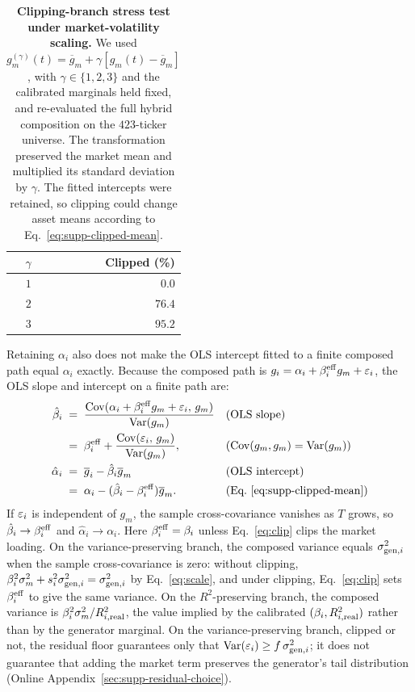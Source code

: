 \begin{table}[H]
\centering
\caption{\textbf{Clipping-branch stress test under market-volatility
    scaling.} We used
    $g_m^{(\gamma)}(t)=\overline{g}_m+
    \gamma[g_m(t)-\overline{g}_m]$, with
    $\gamma\in\{1,2,3\}$ and the calibrated marginals held fixed,
    and re-evaluated the full hybrid composition on the $423$-ticker
    universe. The transformation preserved the market mean and
    multiplied its standard deviation by $\gamma$. The fitted
    intercepts were retained, so clipping could change asset means
    according to Eq.~\eqref{eq:supp-clipped-mean}.}
\label{tab:stress}
\small
\begin{tabular}{@{}rr@{}}
\toprule
\textbf{$\gamma$} & \textbf{Clipped (\%)} \\ \midrule
$1$ & $0.0$  \\
$2$ & $76.4$ \\
$3$ & $95.2$ \\
\bottomrule
\end{tabular}
\end{table}

Retaining $\alpha_i$ also does not make the OLS intercept fitted to a
finite composed path equal $\alpha_i$ exactly. Because the composed
path is $g_i = \alpha_i + \beta_i^{\mathrm{eff}} g_m + \varepsilon_i$, the OLS slope
and intercept on a finite path are:
\begin{align}
  \hat\beta_i
    &\;=\; \frac{\operatorname{Cov}(\alpha_i + \beta_i^{\mathrm{eff}} g_m + \varepsilon_i,\, g_m)}{\operatorname{Var}(g_m)}
    && \text{(OLS slope)} \notag \\
    &\;=\; \beta_i^{\mathrm{eff}} + \frac{\operatorname{Cov}(\varepsilon_i,\, g_m)}{\operatorname{Var}(g_m)},
    && \text{($\operatorname{Cov}(g_m, g_m) = \operatorname{Var}(g_m)$)} \notag \\
  \hat\alpha_i
    &\;=\; \overline{g}_i-\hat\beta_i\overline{g}_m
    && \text{(OLS intercept)} \notag \\
    &\;=\; \alpha_i-(\hat\beta_i-\beta_i^{\mathrm{eff}})\overline{g}_m.
    && \text{(Eq.~\eqref{eq:supp-clipped-mean})}
\end{align}
If $\varepsilon_i$ is independent of $g_m$, the sample cross-covariance
vanishes as $T$ grows, so $\hat\beta_i \to \beta_i^{\mathrm{eff}}$ and
$\hat\alpha_i \to \alpha_i$. Here $\beta_i^{\mathrm{eff}}=\beta_i$ unless
Eq.~\eqref{eq:clip} clips the market loading. On the
variance-preserving branch, the composed variance equals
$\sigma_{\mathrm{gen},i}^2$ when the sample cross-covariance is zero: without
clipping, $\beta_i^2 \sigma_m^2 + s_i^2 \sigma_{\mathrm{gen},i}^2 =
\sigma_{\mathrm{gen},i}^2$ by Eq.~\eqref{eq:scale}, and under clipping,
Eq.~\eqref{eq:clip} sets $\beta_i^{\mathrm{eff}}$ to give the same variance.
On the $R^2$-preserving branch, the composed variance is
$\beta_i^2 \sigma_m^2 / R^2_{i,\mathrm{real}}$, the value implied by the
calibrated $(\beta_i, R^2_{i,\mathrm{real}})$ rather than by the generator
marginal. On the variance-preserving branch, clipped or not, the
residual floor guarantees only that $\operatorname{Var}(\varepsilon_i)\geq
f\,\sigma_{\mathrm{gen},i}^2$; it does not guarantee that adding the market
term preserves the generator's tail distribution (Online
Appendix~\ref{sec:supp-residual-choice}).

